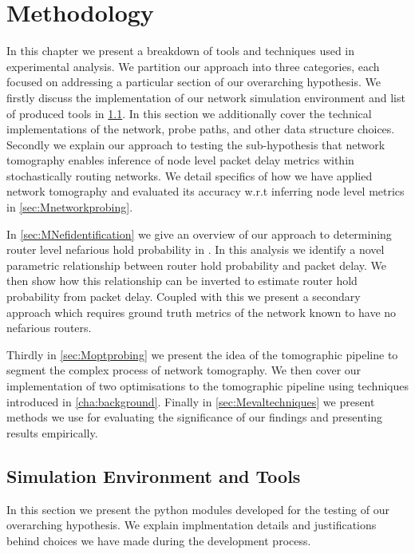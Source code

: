 \chapter{Methodology}
\label{cha:methodology}
In this chapter we present a breakdown of tools and techniques used in experimental analysis. We partition our approach into three categories, each focused on addressing a particular section of our overarching hypothesis. We firstly discuss the implementation of our network simulation environment and list of produced tools in \cref{sec:Msimenvironment}. In this section we additionally cover the technical implementations of the network, probe paths, and other data structure choices. Secondly we explain our approach to testing the sub-hypothesis that network tomography enables inference of node level packet delay metrics within stochastically routing networks. We detail specifics of how we have applied network tomography and evaluated its accuracy w.r.t inferring node level metrics in \cref{sec:Mnetworkprobing}.\par
In \cref{sec:MNefidentification} we give an overview of our approach to determining router level nefarious hold probability in . In this analysis we identify a novel parametric relationship between router hold probability and packet delay. We then show how this relationship can be inverted to estimate router hold probability from packet delay. Coupled with this we present a secondary approach which requires ground truth metrics of the network known to have no nefarious routers.\par
Thirdly in \cref{sec:Moptprobing} we present the idea of the tomographic pipeline to segment the complex process of network tomography. We then cover our implementation of two optimisations to the tomographic pipeline using techniques introduced in \cref{cha:background}. Finally in \cref{sec:Mevaltechniques} we present methods we use for evaluating the significance of our findings and presenting results empirically.

\section{Simulation Environment and Tools}
\label{sec:Msimenvironment}
In this section we present the python modules developed for the testing of our overarching hypothesis. We explain implmentation details and justifications behind choices we have made during the development process.

\cite{virtanen_scipy_2020}



